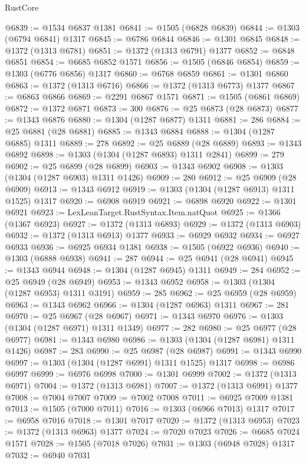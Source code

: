 \begin{lexlean}{RustCore}
\begin{coremodule}
@6839 := @1534 @6837 @1381
@6841 := @1505 (@6828 @6839)
@6844 := @1303 (@6794 @6841) @1317
@6845 := @6786 @6844
@6846 := @1301 @6845
@6848 := @1372 (@1313 @6781)
@6851 := @1372 (@1313 @6791) @1377
@6852 := @6848 @6851
@6854 := @6685 @6852 @1571
@6856 := @1505 (@6846 @6854)
@6859 := @1303 (@6776 @6856) @1317
@6860 := @6768 @6859
@6861 := @1301 @6860
@6863 := @1372 (@1313 @6716)
@6866 := @1372 (@1313 @6773) @1377
@6867 := @6863 @6866
@6869 := @2291 @6867 @1571
@6871 := @1505 (@6861 @6869)
@6872 := @1372 @6871
@6873 := 300
@6876 := @25 @6873 (@28 @6873)
@6877 := @1343 @6876
@6880 := @1304 (@1287 @6877) @1311
@6881 := 286
@6884 := @25 @6881 (@28 @6881)
@6885 := @1343 @6884
@6888 := @1304 (@1287 @6885) @1311
@6889 := 278
@6892 := @25 @6889 (@28 @6889)
@6893 := @1343 @6892
@6898 := @1303 (@1304 (@1287 @6893) @1311 @2841)
@6899 := 279
@6902 := @25 @6899 (@28 @6899)
@6903 := @1343 @6902
@6908 := @1303 (@1304 (@1287 @6903) @1311 @1426)
@6909 := 280
@6912 := @25 @6909 (@28 @6909)
@6913 := @1343 @6912
@6919 := @1303 (@1304 (@1287 @6913) @1311 @1525) @1317
@6920 := @6908 @6919
@6921 := @6898 @6920
@6922 := @1301 @6921
@6923 := LexLeanTarget.RustSyntax.Item.natQuot
@6925 := @1366 (@1367 @6923)
@6927 := @1372 (@1313 @6893)
@6929 := @1372 (@1313 @6903)
@6932 := @1372 (@1313 @6913) @1377
@6933 := @6929 @6932
@6934 := @6927 @6933
@6936 := @6925 @6934 @1381
@6938 := @1505 (@6922 @6936)
@6940 := @1303 (@6888 @6938)
@6941 := 287
@6944 := @25 @6941 (@28 @6941)
@6945 := @1343 @6944
@6948 := @1304 (@1287 @6945) @1311
@6949 := 284
@6952 := @25 @6949 (@28 @6949)
@6953 := @1343 @6952
@6958 := @1303 (@1304 (@1287 @6953) @1311 @3191)
@6959 := 285
@6962 := @25 @6959 (@28 @6959)
@6963 := @1343 @6962
@6966 := @1304 (@1287 @6963) @1311
@6967 := 281
@6970 := @25 @6967 (@28 @6967)
@6971 := @1343 @6970
@6976 := @1303 (@1304 (@1287 @6971) @1311 @1349)
@6977 := 282
@6980 := @25 @6977 (@28 @6977)
@6981 := @1343 @6980
@6986 := @1303 (@1304 (@1287 @6981) @1311 @1426)
@6987 := 283
@6990 := @25 @6987 (@28 @6987)
@6991 := @1343 @6990
@6997 := @1303 (@1304 (@1287 @6991) @1311 @1525) @1317
@6998 := @6986 @6997
@6999 := @6976 @6998
@7000 := @1301 @6999
@7002 := @1372 (@1313 @6971)
@7004 := @1372 (@1313 @6981)
@7007 := @1372 (@1313 @6991) @1377
@7008 := @7004 @7007
@7009 := @7002 @7008
@7011 := @6925 @7009 @1381
@7013 := @1505 (@7000 @7011)
@7016 := @1303 (@6966 @7013) @1317
@7017 := @6958 @7016
@7018 := @1301 @7017
@7020 := @1372 (@1313 @6953)
@7023 := @1372 (@1313 @6963) @1377
@7024 := @7020 @7023
@7026 := @6685 @7024 @1571
@7028 := @1505 (@7018 @7026)
@7031 := @1303 (@6948 @7028) @1317
@7032 := @6940 @7031

\end{coremodule}
\end{lexlean}
